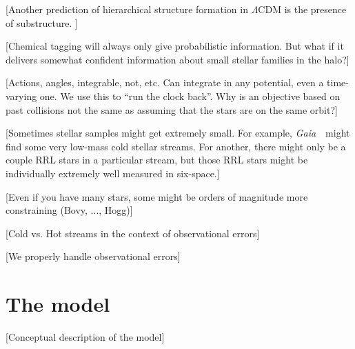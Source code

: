 \documentclass[letterpaper,12pt,preprint]{aastex}
\newcommand{\project}[1]{\textsl{#1}}
\newcommand{\gaia}{\project{Gaia}~}
\begin{document}
[Another prediction of hierarchical structure formation in $\Lambda$CDM is the presence of substructure. ]

[Chemical tagging will always only give probabilistic information.
  But what if it delivers somewhat confident information about small
  stellar families in the halo?]

[Actions, angles, integrable, not, etc.  Can integrate in any
  potential, even a time-varying one. We use this to
  ``run the clock back''.  Why is an objective based on past collisions not the
  same as assuming that the stars are on the same orbit?]

[Sometimes stellar samples might get extremely small.  For example,
  \gaia\ might find some very low-mass cold stellar streams.  For
  another, there might only be a couple RRL stars in a particular
  stream, but those RRL stars might be individually extremely well
  measured in six-space.]

[Even if you have many stars, some might be orders of magnitude more constraining (Bovy, ..., Hogg)]

[Cold vs. Hot streams in the context of observational errors]

[We properly handle observational errors]

\section{The model}

[Conceptual description of the model]
\end{document}
